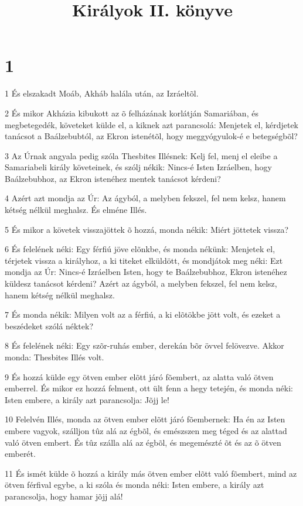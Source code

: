 

\title{Királyok II. könyve}


\chapter{1}

\par 1 És elszakadt Moáb, Akháb halála után, az Izráeltõl.
\par 2 És mikor Akházia kibukott az õ felházának korlátján Samariában, és megbetegedék, követeket külde el, a kiknek azt parancsolá: Menjetek el, kérdjetek tanácsot a Baálzebubtól, az Ekron istenétõl, hogy meggyógyulok-é e betegségbõl?
\par 3 Az Úrnak angyala pedig szóla Thesbites Illésnek: Kelj fel, menj el eleibe a Samariabeli király követeinek, és szólj nékik: Nincs-é Isten Izráelben, hogy Baálzebubhoz, az Ekron istenéhez mentek tanácsot kérdeni?
\par 4 Azért azt mondja az Úr: Az ágyból, a melyben fekszel, fel nem kelsz, hanem kétség nélkül meghalsz. És elméne Illés.
\par 5 És mikor a követek visszajöttek õ hozzá, monda nékik: Miért jöttetek vissza?
\par 6 És felelének néki: Egy férfiú jöve elõnkbe, és monda nékünk: Menjetek el, térjetek vissza a királyhoz, a ki titeket elküldött, és mondjátok meg néki: Ezt mondja az Úr: Nincs-é Izráelben Isten, hogy te Baálzebubhoz, Ekron istenéhez küldesz tanácsot kérdeni? Azért az ágyból, a melyben fekszel, fel nem kelsz, hanem kétség nélkül meghalsz.
\par 7 És monda nékik: Milyen volt az a férfiú, a ki elõtökbe jött volt, és ezeket a beszédeket szólá néktek?
\par 8 És felelének néki: Egy szõr-ruhás ember, derekán bõr övvel felövezve. Akkor monda: Thesbites Illés volt.
\par 9 És hozzá külde egy ötven ember elõtt járó fõembert, az alatta való ötven emberrel. És mikor ez hozzá felment, ott ült fenn a hegy tetején, és monda néki: Isten embere, a király azt parancsolja: Jõjj le!
\par 10 Felelvén Illés, monda az ötven ember elõtt járó fõembernek: Ha én az Isten embere vagyok, szálljon tûz alá az égbõl, és emészszen meg téged és az alattad való ötven embert. És tûz szálla alá az égbõl, és megemészté õt és az õ ötven emberét.
\par 11 És ismét külde õ hozzá a király más ötven ember elõtt való fõembert, mind az ötven férfival egybe, a ki szóla és monda néki: Isten embere, a király azt parancsolja, hogy hamar jõjj alá!
